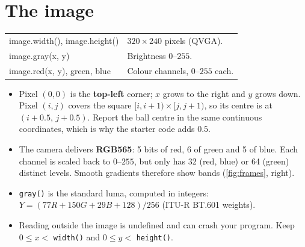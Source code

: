 \documentclass[10pt,a4paper]{article}
\begin{document}
\section{The image}
\begin{center}
\begin{tabularx}{\textwidth}{>{\ttfamily}lX}
\toprule
image.width(), image.height() & $320\times240$ pixels (QVGA).\\
image.gray(x, y) & Brightness $0$--$255$.\\
image.red(x, y), green, blue & Colour channels, $0$--$255$ each.\\
\bottomrule
\end{tabularx}
\end{center}
\begin{itemize}
  \item Pixel $(0,0)$ is the \textbf{top-left} corner; $x$ grows to the right and $y$ grows down.
        Pixel $(i,j)$ covers the square $[i,i+1)\times[j,j+1)$, so its centre is at
        $(i+0.5,\,j+0.5)$. Report the ball centre in the same continuous coordinates, which is why
        the starter code adds $0.5$.
  \item The camera delivers \textbf{RGB565}: 5 bits of red, 6 of green and 5 of blue. Each channel
        is scaled back to $0$--$255$, but only has 32 (red, blue) or 64 (green) distinct levels.
        Smooth gradients therefore show bands (\cref{fig:frames}, right).
  \item \texttt{gray()} is the standard luma, computed in integers:
        $Y=(77R+150G+29B+128)/256$ (ITU-R BT.601 weights).
  \item Reading outside the image is undefined and can crash your program. Keep $0\le x<$
        \texttt{width()} and $0\le y<$ \texttt{height()}.
\end{itemize}

\end{document}
